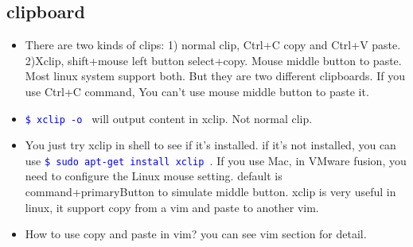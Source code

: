 \documentclass[a4paper,12pt,twoside]{book}
\newcommand{\linuxcommand}[1]{\texttt{\textcolor{blue}{\$ #1 \Pisymbol{psy}{191}}}}
\begin{document}
\subsection{clipboard}
	\begin{itemize}
			\item There are two kinds of clips: 1) normal clip, Ctrl+C copy and Ctrl+V paste. 2)Xclip, shift+mouse left button select+copy. Mouse middle button to paste. Most linux system support both. But they are two different clipboards. If you use Ctrl+C command, You can't use mouse middle button to paste it.
			
			\item \linuxcommand{xclip -o} will output content in xclip. Not normal clip.
					
			\item You just try xclip in shell to see if it's installed. if it's not installed, you can use \linuxcommand{sudo apt-get install xclip}. If you use Mac, in VMware fusion, you need to configure the Linux mouse setting.  default is command+primaryButton to simulate middle button.  xclip is very useful in linux, it support copy from a vim and paste to another vim.  
			\item How to use copy and paste in vim? you can see vim section for detail.
	\end{itemize}
\end{document}
